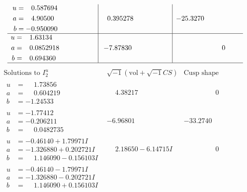 \documentclass[1p]{elsarticle_modified}
\theoremstyle{definition}
\newcommand{\I}{\sqrt{-1}}
\begin{document}
$$\begin{array}{c|c|c}
\begin{aligned}
u &= \phantom{-}0.587694\phantom{ +0.000000I} \\
a &= \phantom{-}4.90500\phantom{ +0.000000I} \\
b &= -0.950090\phantom{ +0.000000I}\end{aligned}
 & \phantom{-}0.395278\phantom{ +0.000000I} & -25.3270\phantom{ +0.000000I} \\ \hline\begin{aligned}
u &= \phantom{-}1.63134\phantom{ +0.000000I} \\
a &= \phantom{-}0.0852918\phantom{ +0.000000I} \\
b &= \phantom{-}0.694360\phantom{ +0.000000I}\end{aligned}
 & -7.87830\phantom{ +0.000000I} & \phantom{-0.000000 } 0\\
 \hline 
 \end{array}$$\newpage$$\begin{array}{c|c|c}  
\text{Solutions to }I^u_{2}& \I (\text{vol} + \sqrt{-1}CS) & \text{Cusp shape}\\
 \hline 
\begin{aligned}
u &= \phantom{-}1.73856\phantom{ +0.000000I} \\
a &= \phantom{-}0.604219\phantom{ +0.000000I} \\
b &= -1.24533\phantom{ +0.000000I}\end{aligned}
 & \phantom{-}4.38217\phantom{ +0.000000I} & \phantom{-0.000000 } 0 \\ \hline\begin{aligned}
u &= -1.77412\phantom{ +0.000000I} \\
a &= -0.206211\phantom{ +0.000000I} \\
b &= \phantom{-}0.0482735\phantom{ +0.000000I}\end{aligned}
 & -6.96801\phantom{ +0.000000I} & -33.2740\phantom{ +0.000000I} \\ \hline\begin{aligned}
u &= -0.46140 + 1.79971 I \\
a &= -1.326880 + 0.202721 I \\
b &= \phantom{-}1.146090 - 0.156103 I\end{aligned}
 & \phantom{-}2.18650 - 6.14715 I & \phantom{-0.000000 } 0 \\ \hline\begin{aligned}
u &= -0.46140 - 1.79971 I \\
a &= -1.326880 - 0.202721 I \\
b &= \phantom{-}1.146090 + 0.156103 I\end{aligned}

\end{array}$$
\end{document}
